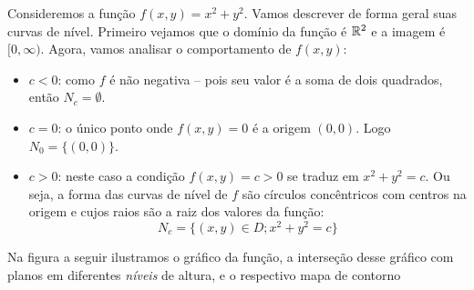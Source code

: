 \begin{example}{}{}
Consideremos a função \(f(x,y) = x^2 + y^2\). Vamos descrever de forma geral suas curvas de nível. Primeiro vejamos que o domínio da função é $\mathbb{R}^2$ e a imagem é $[0,\infty)$. Agora, vamos analisar o comportamento de \(f(x,y)\):
\begin{itemize}[label=\color{examplescolor}\textbullet]

\item $c<0$: como $f$ é não negativa -- pois seu valor é a soma de dois quadrados, então $N_c=\emptyset$.

\item $c=0$: o único ponto onde \(f(x,y) = 0\) é a origem \((0,0)\). Logo $N_0=\{(0,0)\}$. 


\item $c>0$: neste caso a condição $f(x,y)=c>0$ se traduz em $x^2+y^2=c$. Ou seja, a forma das curvas de nível de $f$ são círculos  concêntricos com centros na origem e cujos raios são a raiz dos valores da função:
$$N_c=\{(x,y)\in D; x^2+y^2=c\}$$
\end{itemize}

Na figura a seguir ilustramos o gráfico da função, a interseção desse gráfico com planos em diferentes \textit{níveis} de altura, e o respectivo mapa de contorno 
\begin{center}
\end{center}
\end{example}
